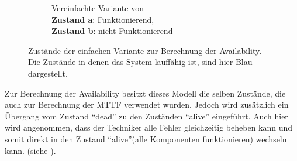 \documentclass[
            a4paper
            ]{scrartcl}%
\begin{document}
\begin{figure}
\begin{subfigure}[b]{0.48\linewidth}
            \caption{Vereinfachte Variante von  \\
                \textbf{Zustand a}: Funktionierend, \\
                \textbf{Zustand b}: nicht Funktionierend}
            \label{fig:states_simple_avail_simply}
    \end{subfigure}
    \caption{Zustände der einfachen Variante zur Berechnung der Availability.\\
        Die Zustände in denen das System lauffähig ist, sind hier Blau
    dargestellt.}
    \label{fig:states_simple_avail_comb}
\end{figure}
Zur Berechnung der Availability besitzt dieses Modell die selben Zustände, die
auch zur Berechnung der MTTF verwendet wurden. Jedoch wird zusätzlich ein
Übergang vom Zustand \enquote{dead} zu den Zuständen \enquote{alive} eingeführt.
Auch hier wird angenommen, dass der Techniker alle Fehler gleichzeitig beheben
kann und somit direkt in den Zustand \enquote{alive}(alle Komponenten
funktionieren) wechseln kann.
(siehe ).
\end{document}
